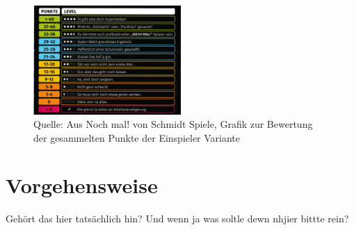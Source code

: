 \begin{figure}[!h]
	\centering
	\includegraphics[width=0.5\textwidth]{Bilder/Punkte.jpeg}
	\caption{Quelle: Aus Noch mal! von Schmidt Spiele, Grafik zur Bewertung der gesammelten Punkte der Einspieler Variante}
\end{figure}
\newpage

\section{Vorgehensweise}
Gehört das hier tatsächlich hin?
Und wenn ja was soltle dewn nhjier bittte rein?
